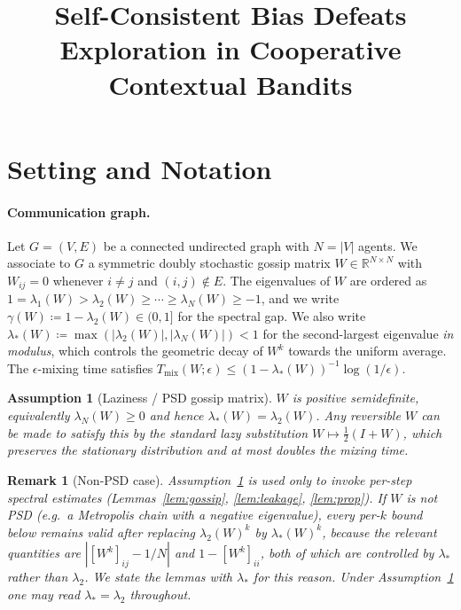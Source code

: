 \documentclass[11pt]{article}
\title{Self-Consistent Bias Defeats Exploration in Cooperative Contextual Bandits}
\author{}
\date{}
\newtheorem{assumption}[theorem]{Assumption}
\newtheorem{remark}[theorem]{Remark}
\begin{document}
\maketitle

\tableofcontents
\newpage

\section{Setting and Notation}\label{sec:setting}

\paragraph{Communication graph.}
Let $G=(V,E)$ be a connected undirected graph with $N=|V|$ agents.
We associate to $G$ a symmetric doubly stochastic gossip matrix
$W\in\mathbb{R}^{N\times N}$ with $W_{ij}=0$ whenever $i\neq j$
and $(i,j)\notin E$.  The eigenvalues of $W$ are ordered as
$1=\lambda_1(W)>\lambda_2(W)\geq\cdots\geq\lambda_N(W)\geq -1$,
and we write $\gamma(W)\coloneqq 1-\lambda_2(W)\in(0,1]$ for the
spectral gap.  We also write
$\lambda_*(W)\coloneqq\max(|\lambda_2(W)|,|\lambda_N(W)|)<1$
for the second-largest eigenvalue \emph{in modulus}, which controls
the geometric decay of $W^k$ towards the uniform average.
The $\epsilon$-mixing time satisfies
$T_{\mathrm{mix}}(W;\epsilon)\leq(1-\lambda_*(W))^{-1}\log(1/\epsilon)$.

\begin{assumption}[Laziness / PSD gossip matrix]\label{ass:lazy}
$W$ is positive semidefinite, equivalently $\lambda_N(W)\geq 0$ and
hence $\lambda_*(W)=\lambda_2(W)$.  Any reversible $W$ can be made to
satisfy this by the standard lazy substitution
$W\mapsto\tfrac12(I+W)$, which preserves the stationary distribution
and at most doubles the mixing time.
\end{assumption}

\begin{remark}[Non-PSD case]\label{rem:lazy}
Assumption~\ref{ass:lazy} is used only to invoke per-step spectral
estimates (Lemmas~\ref{lem:gossip}, \ref{lem:leakage},
\ref{lem:prop}).  If $W$ is \emph{not} PSD (e.g.\ a Metropolis chain
with a negative eigenvalue), every per-$k$ bound below remains valid
after replacing $\lambda_2(W)^k$ by $\lambda_*(W)^k$, because
the relevant quantities are $|[W^k]_{ij}-1/N|$ and
$1-[W^k]_{ii}$, both of which are controlled by $\lambda_*$ rather
than $\lambda_2$.  We state the lemmas with $\lambda_*$ for this
reason. Under Assumption~\ref{ass:lazy} one may read
$\lambda_*=\lambda_2$ throughout.
\end{remark}
\end{document}
